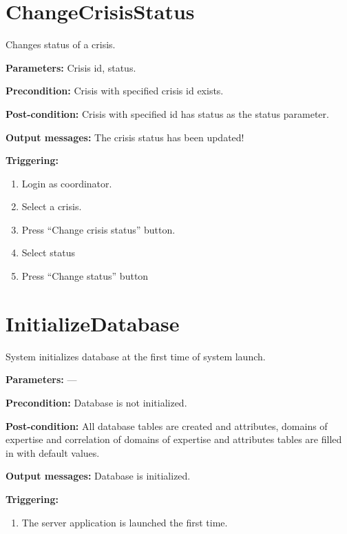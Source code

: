 \section{ChangeCrisisStatus}
\label{operation:ChangeCrisisStatus}
Changes status of a crisis.

\begin{description}

\item \textbf{Parameters:} Crisis id, status.
\item \textbf{Precondition:} Crisis with specified crisis id exists.
\item \textbf{Post-condition:} Crisis with specified id has status as
the status parameter.

\item \textbf{Output messages:} The crisis status has been updated!

\item \textbf{Triggering:}
\begin{enumerate}
\item Login as coordinator.
\item Select a crisis.
\item Press ``Change crisis status'' button.
\item Select status
\item Press ``Change status'' button
\end{enumerate}
 
\end{description}

\section{InitializeDatabase}
\label{operation:InitializeDatabase}
System initializes database at the first time of system launch.

\begin{description}

\item \textbf{Parameters:} ---
\item \textbf{Precondition:} Database is not initialized.
\item \textbf{Post-condition:} All database tables are created and attributes,
domains of expertise and correlation of domains of expertise and attributes
tables are filled in with default values.

\item \textbf{Output messages:} Database is initialized.

\item \textbf{Triggering:}
\begin{enumerate}
\item The server application is launched the first time.
\end{enumerate}
 
\end{description}